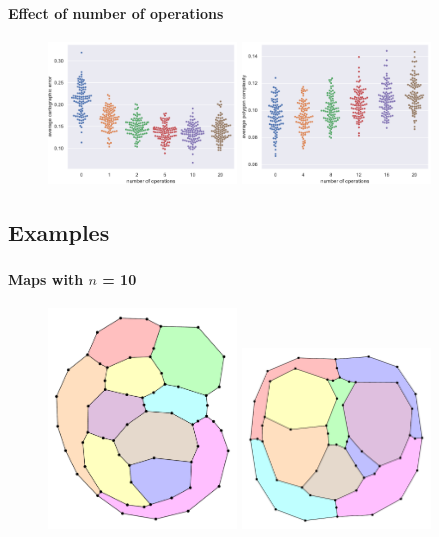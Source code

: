\documentclass[t,18pt]{beamer}
\begin{document}
\begin{frame}[c]
  \frametitle{}
  \framesubtitle{Effect of number of operations}
  \begin{figure}
    \includegraphics[width=5cm]{../Thesis/Resources/Evaluation-AverageCartographicError-t.pdf}
    \quad
    \includegraphics[width=5cm]{../Thesis/Resources/Evaluation-AveragePolygonComplexity-t.pdf}
  \end{figure}
\end{frame}

\subsection{Examples}
\label{subsect:examples}

\begin{frame}[c]
  \frametitle{}
  \framesubtitle{Maps with $n$ = 10}
  \begin{figure}
    \includegraphics[width=5cm]{../Thesis/Resources/Evaluation-Example-n10-0F69CDD9-EAAD-4F81-934F-8BA98B1424F6-2.pdf}
    \quad
    \includegraphics[width=5cm]{../Thesis/Resources/Evaluation-Example-n10-9A841901-DFA0-4ECD-A758-87E1C8A1D0D0-0.pdf}
  \end{figure}
\end{frame}
\end{document}
